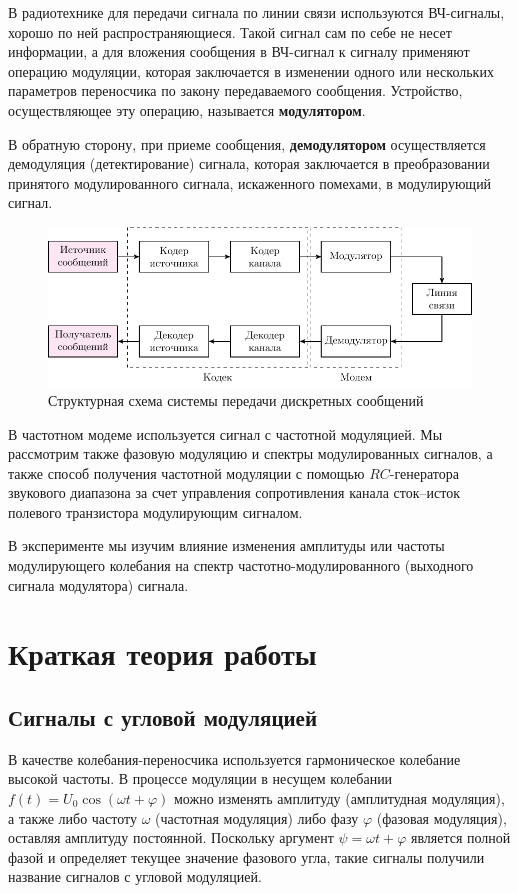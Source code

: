\documentclass[a4paper,12pt]{article}
\renewcommand{\phi}{\varphi}
\begin{document}
В радиотехнике для передачи сигнала по линии связи используются ВЧ-сигналы, хорошо по ней распространяющиеся. Такой сигнал сам по себе не несет информации, а для вложения сообщения в ВЧ-сигнал к сигналу применяют операцию модуляции, которая заключается в изменении одного или нескольких параметров переносчика по закону передаваемого сообщения. Устройство, осуществляющее эту операцию, называется \textbf{модулятором}.

В обратную сторону, при приеме сообщения, \textbf{демодулятором} осуществляется  демодуляция (детектирование) сигнала, которая заключается в преобразовании принятого модулированного сигнала, искаженного помехами, в модулирующий сигнал. 

\begin{figure}[H]
	\centering
	\includegraphics[scale=1]{plot/struct}
	\caption{Структурная схема системы передачи дискретных сообщений}
	\label{fig:2}
\end{figure} 

В частотном модеме используется сигнал с частотной модуляцией. Мы рассмотрим также фазовую модуляцию и спектры модулированных сигналов, а также способ получения частотной модуляции с помощью $RC$-генератора звукового диапазона за счет управления сопротивления канала сток--исток полевого транзистора модулирующим сигналом. 

В эксперименте мы изучим влияние изменения амплитуды или частоты модулирующего колебания на спектр частотно-модулированного (выходного сигнала модулятора) сигнала. 

\section{Краткая теория работы}
\subsection{Сигналы с угловой модуляцией}
В качестве колебания-переносчика используется гармоническое колебание высокой частоты. В процессе модуляции в несущем колебании $f(t)=U_{0} \cos (\omega t+\varphi)$ можно изменять амплитуду (амплитудная модуляция), а также либо частоту $\omega$ (частотная модуляция) либо фазу $\phi$ (фазовая модуляция), оставляя амплитуду постоянной. Поскольку аргумент $\psi=\omega t+\phi$ является полной фазой и определяет текущее значение фазового угла, такие сигналы получили название сигналов с угловой модуляцией.
\end{document}
